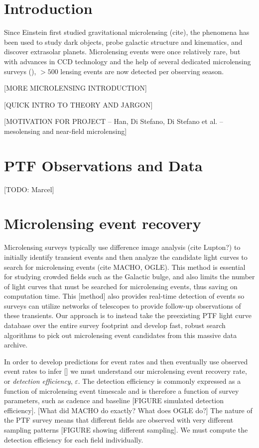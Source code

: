 \documentclass[12pt,preprint]{aastex}
\begin{document}
\section{Introduction}
Since Einstein first studied gravitational microlensing (cite), the phenomena has been used to study dark objects, probe galactic structure and kinematics, and discover extrasolar planets. Microlensing events were once relatively rare, but with advances in CCD technology and the help of several dedicated microlensing surveys (), $>500$ lensing events are now detected per observing season. 

[MORE MICROLENSING INTRODUCTION]

[QUICK INTRO TO THEORY AND JARGON]

[MOTIVATION FOR PROJECT -- Han, Di Stefano, Di Stefano et al. -- mesolensing and near-field microlensing]

\section{PTF Observations and Data}
[TODO: Marcel]

\section{Microlensing event recovery}
Microlensing surveys typically use difference image analysis (cite Lupton?) to initially identify transient events and then analyze the candidate light curves to search for microlensing events (cite MACHO, OGLE). This method is essential for studying crowded fields such as the Galactic bulge, and also limits the number of light curves that must be searched for microlensing events, thus saving on computation time. This [method] also provides real-time detection of events so surveys can utilize networks of telescopes to provide follow-up observations of these transients. Our approach is to instead take the preexisting PTF light curve database over the entire survey footprint and develop fast, robust search algorithms to pick out microlensing event candidates from this massive data archive.

In order to develop predictions for event rates and then eventually use observed event rates to infer [] we must understand our microlensing event recovery rate, or \textit{detection efficiency}, $\varepsilon$. The detection efficiency is commonly expressed as a function of microlensing event timescale and is therefore a function of survey parameters, such as cadence and baseline [FIGURE simulated detection efficiency]. [What did MACHO do exactly? What does OGLE do?] The nature of the PTF survey means that different fields are observed with very different sampling patterns [FIGURE showing different sampling]. We must compute the detection efficiency for each field individually.
\end{document}
